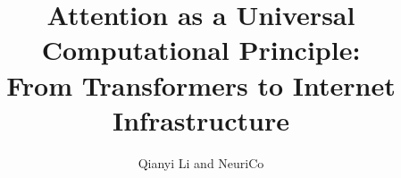 \documentclass{article}
\title{Attention as a Universal Computational Principle:\\From Transformers to Internet Infrastructure}
\author{Qianyi Li and NeuriCo}
\begin{document}
\maketitle

\begin{abstract}

\end{abstract}










\end{document}
